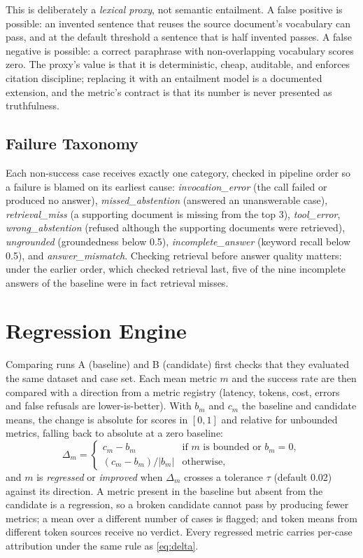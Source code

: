 \documentclass[conference]{IEEEtran}
\begin{document}
This is deliberately a \emph{lexical proxy}, not semantic entailment. A
false positive is possible: an invented sentence that reuses the source
document's vocabulary can pass, and at the default threshold a sentence
that is half invented passes. A false negative is possible: a correct
paraphrase with non-overlapping vocabulary scores zero. The proxy's value
is that it is deterministic, cheap, auditable, and enforces citation
discipline; replacing it with an entailment model is a documented
extension, and the metric's contract is that its number is never presented
as truthfulness.

\subsection{Failure Taxonomy}
Each non-success case receives exactly one category, checked in pipeline
order so a failure is blamed on its earliest cause:
\emph{invocation\_error} (the call failed or produced no answer),
\emph{missed\_abstention} (answered an unanswerable case),
\emph{retrieval\_miss} (a supporting document is missing from the top 3),
\emph{tool\_error}, \emph{wrong\_abstention} (refused although the
supporting documents were retrieved), \emph{ungrounded} (groundedness below
0.5), \emph{incomplete\_answer} (keyword recall below 0.5), and
\emph{answer\_mismatch}. Checking retrieval before answer quality matters:
under the earlier order, which checked retrieval last, five of the nine
incomplete answers of the baseline were in fact retrieval misses.

\section{Regression Engine}
Comparing runs A (baseline) and B (candidate) first checks that they
evaluated the same dataset and case set. Each mean metric $m$ and the
success rate are then compared with a direction from a metric registry
(latency, tokens, cost, errors and false refusals are lower-is-better).
With $b_m$ and $c_m$ the baseline and candidate means, the change is
absolute for scores in $[0,1]$ and relative for unbounded metrics, falling
back to absolute at a zero baseline:
\begin{equation}
\Delta_m = \begin{cases}
c_m - b_m & \text{if } m \text{ is bounded or } b_m = 0,\\
(c_m - b_m)/|b_m| & \text{otherwise,}
\end{cases}
\label{eq:delta}
\end{equation}
and $m$ is \emph{regressed} or \emph{improved} when $\Delta_m$ crosses a
tolerance $\tau$ (default 0.02) against its direction. A metric present in
the baseline but absent from the candidate is a regression, so a broken
candidate cannot pass by producing fewer metrics; a mean over a different
number of cases is flagged; and token means from different token sources
receive no verdict. Every regressed metric carries per-case attribution
under the same rule as \eqref{eq:delta}.
\end{document}
